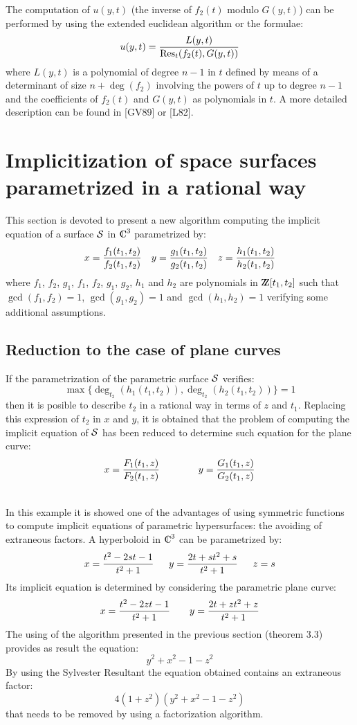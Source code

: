 \medskip

The computation of $u(y,t)$ (the inverse
of $f_2(t)$ modulo $G(y,t)$) can be performed by using the extended
euclidean algorithm or the formulae:
\[u(y,t)={{L(y,t)}\over{{\rm Res}_t(f_2(t),G(y,t))}}\] where $L(y,t)$
is a polynomial of degree $n-1$ in $t$ defined by means of a
determinant of size $n+\deg(f_2)$ involving the powers of $t$ up to
degree $n-1$ and the coefficients of $f_2(t)$ and $G(y,t)$ as
polynomials in 
$t$. A more detailed description can be found in [GV89] or [L82]. 


\section{Implicitization of space surfaces parametrized in a rational
way} 



This section is devoted to present a new algorithm computing the
implicit equation of a surface ${\cal S}$ in $\C^3$ parametrized by:
\[x={{f_1(t_1,t_2)}\over{f_2(t_1,t_2)}}\quad
y={{g_1(t_1,t_2)}\over{g_2(t_1,t_2)}}
\quad z={{h_1(t_1,t_2)}\over{h_2(t_1,t_2)}}\] where $f_1$, $f_2$,
$g_1$,
$f_1$, $f_2$, $g_1$, $g_2$, $h_1$ and $h_2$ are polynomials in
$\Z[t_1,t_2]$ such that $\gcd(f_1,f_2)=1$, $\gcd(g_1,g_2)=1$ and
$\gcd(h_1,h_2)=1$ verifying some additional assumptions. 

\subsection{Reduction to the case of plane curves}

If the parametrization of the parametric surface ${\cal S}$ verifies:
\[\max\{\deg_{t_2}(h_1(t_1,t_2)),\deg_{t_2}(h_2(t_1,t_2))\}=1\] then
it is posible to describe $t_2$ in a rational way in terms of $z$ and
$t_1$. Replacing this expression of $t_2$ in $x$ and $y$, it is
obtained that  the problem of computing the implicit equation of
${\cal S}$ has been reduced  to determine such equation for the plane
curve:
\[x={{F_1(t_1,z)}\over{F_2(t_1,z)}}\qquad\qquad
  y={{G_1(t_1,z)}\over{G_2(t_1,z)}}\]

\begin{ejemplo}
\hskip 0pt\\ {\rm  In this example it is showed one of the 
advantages of using symmetric functions to compute implicit 
equations of parametric hypersurfaces: the avoiding of extraneous
factors. A hyperboloid in $\C^3$ can be parametrized by:
\[x={{t^2-2st-1}\over{t^2+1}}\quad\;\;
y={{2t+st^2+s}\over{t^2+1}}\quad\;\; z=s\] Its implicit equation is
determined by considering the parametric plane curve:
\[x={{t^2-2zt-1}\over{t^2+1}}\qquad y={{2t+zt^2+z}\over{t^2+1}}\] The
using of the algorithm presented in the previous section (theorem 
3.3) provides as result the equation:
\[y^2+x^2-1-z^2\] By using the Sylvester Resultant the equation
obtained contains an extraneous factor:
\[4(1+z^2)(y^2+x^2-1-z^2)\] that needs to be removed by using a
factorization algorithm. }
\end{ejemplo}

